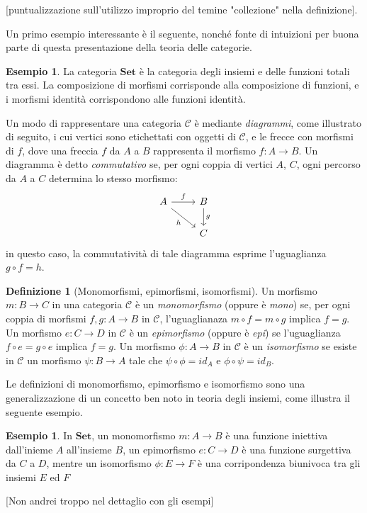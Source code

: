 \documentclass{article}
\theoremstyle{plain}
\theoremstyle{definition}
\newtheorem{definition}[theorem]{Definizione}
\newtheorem{example}[theorem]{Esempio}
\newcommand{\id}[1]{id_{#1}}
\begin{document}
	[puntualizzazione sull'utilizzo improprio del temine "collezione" nella definizione].
	
	Un primo esempio interessante è il seguente, nonché fonte di intuizioni per buona parte 
	di questa presentazione della teoria delle categorie.

	\begin{example}
		La categoria $\textbf{Set}$ è la categoria degli insiemi e delle funzioni totali tra essi. 
		La composizione di morfismi corrisponde alla composizione di funzioni, 
		e i morfismi identità corrispondono alle funzioni identità.
	\end{example}

	Un modo di rappresentare una categoria $\mathcal{C}$ è mediante \emph{diagrammi}, come illustrato di seguito,
	i cui vertici sono etichettati con oggetti di $\mathcal{C}$, e le frecce con morfismi di $f$, dove una 
	freccia $f$ da $A$ a $B$ rappresenta il morfismo $f: A \rightarrow B$. 
	Un diagramma è detto \emph{commutativo} se, per ogni coppia di vertici $A$, $C$, 
	ogni percorso da $A$ a $C$ determina lo stesso morfismo:
	\[
		\begin{tikzcd}
			A \arrow[r, "f"] \arrow[rd, "h" swap] & B  \arrow[d, "g"] \\
			& C 
		\end{tikzcd}
	\]
	in questo caso, la commutatività di tale diagramma esprime l'uguaglianza $g \circ f = h$.

	\begin{definition}[Monomorfismi, epimorfismi, isomorfismi]
		Un morfismo $m:B \rightarrow C$ in una categoria $\mathcal{C}$ è un \emph{monomorfismo}
		(oppure è \emph{mono}) se, per ogni coppia di morfismi $f, g: A \rightarrow B$ in $\mathcal{C}$, 
		l'uguaglianaza $m \circ f = m \circ g$ implica $f = g$. \-
		Un morfismo $e: C \rightarrow D$ in $\mathcal{C}$ è un \emph{epimorfismo} (oppure è \emph{epi}) se
		l'uguaglianza $f \circ e = g \circ e$ implica $f = g$. \-
		Un morfismo $\phi: A \rightarrow B$ in $\mathcal{C}$ è un \emph{isomorfismo} se esiste in $\mathcal{C}$
		un morfismo $\psi: B \rightarrow A$ tale che $\psi \circ \phi = \id{A}$ e $\phi \circ \psi = \id B$.

	\end{definition}

	Le definizioni di monomorfismo, epimorfismo e isomorfismo sono una generalizzazione di un concetto ben noto
	in teoria degli insiemi, come illustra il seguente esempio.

	\begin{example}
		In $\textbf{Set}$, un monomorfismo $m: A \rightarrow B$ è una 
		funzione iniettiva dall'inieme $A$ all'insieme $B$,
		un epimorfismo $e: C \rightarrow D$ è una funzione surgettiva 
		da $C$ a $D$, mentre un isomorfismo $\phi: E \rightarrow F$
		è una corripondenza biunivoca tra gli insiemi $E$ ed $F$
	\end{example}

	[Non andrei troppo nel dettaglio con gli esempi]

	
\end{document}
